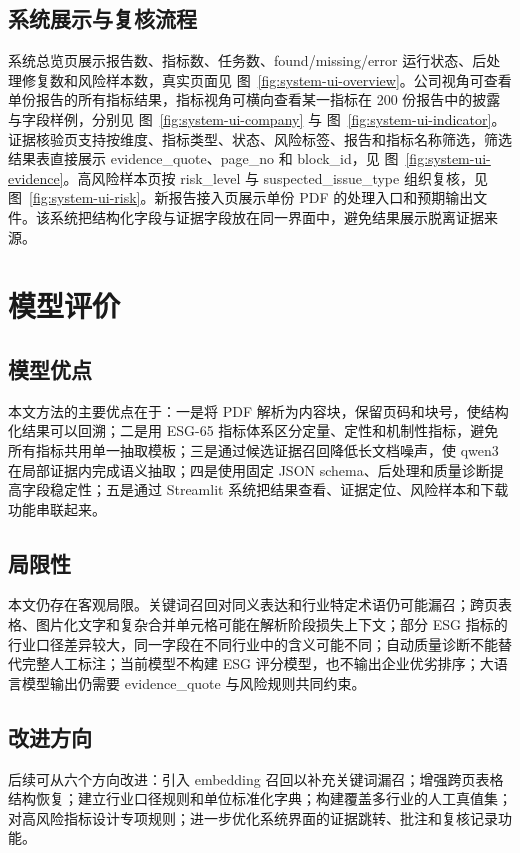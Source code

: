 \documentclass[bwprint]{gmcmthesis}
\numberwithin{figure}{section}
\newcommand{\figref}[1]{图~\ref{#1}}
\begin{document}
\subsection{系统展示与复核流程}
系统总览页展示报告数、指标数、任务数、found/missing/error 运行状态、后处理修复数和风险样本数，真实页面见 \figref{fig:system-ui-overview}。公司视角可查看单份报告的所有指标结果，指标视角可横向查看某一指标在 200 份报告中的披露与字段样例，分别见 \figref{fig:system-ui-company} 与 \figref{fig:system-ui-indicator}。证据核验页支持按维度、指标类型、状态、风险标签、报告和指标名称筛选，筛选结果表直接展示 evidence\_quote、page\_no 和 block\_id，见 \figref{fig:system-ui-evidence}。高风险样本页按 risk\_level 与 suspected\_issue\_type 组织复核，见 \figref{fig:system-ui-risk}。新报告接入页展示单份 PDF 的处理入口和预期输出文件。该系统把结构化字段与证据字段放在同一界面中，避免结果展示脱离证据来源。

\newpage
\section{模型评价}
\subsection{模型优点}
本文方法的主要优点在于：一是将 PDF 解析为内容块，保留页码和块号，使结构化结果可以回溯；二是用 ESG-65 指标体系区分定量、定性和机制性指标，避免所有指标共用单一抽取模板；三是通过候选证据召回降低长文档噪声，使 qwen3 在局部证据内完成语义抽取；四是使用固定 JSON schema、后处理和质量诊断提高字段稳定性；五是通过 Streamlit 系统把结果查看、证据定位、风险样本和下载功能串联起来。

\subsection{局限性}
本文仍存在客观局限。关键词召回对同义表达和行业特定术语仍可能漏召；跨页表格、图片化文字和复杂合并单元格可能在解析阶段损失上下文；部分 ESG 指标的行业口径差异较大，同一字段在不同行业中的含义可能不同；自动质量诊断不能替代完整人工标注；当前模型不构建 ESG 评分模型，也不输出企业优劣排序；大语言模型输出仍需要 evidence\_quote 与风险规则共同约束。

\subsection{改进方向}
后续可从六个方向改进：引入 embedding 召回以补充关键词漏召；增强跨页表格结构恢复；建立行业口径规则和单位标准化字典；构建覆盖多行业的人工真值集；对高风险指标设计专项规则；进一步优化系统界面的证据跳转、批注和复核记录功能。
\end{document}
